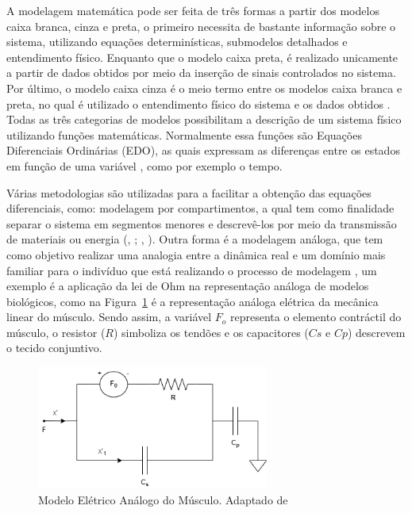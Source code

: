 A modelagem matemática pode ser feita de três formas a partir dos modelos caixa branca, cinza e preta, o primeiro necessita de bastante informação sobre o sistema, utilizando equações determinísticas, submodelos detalhados e entendimento físico. Enquanto que o modelo caixa preta, é realizado unicamente a partir de dados obtidos por meio da inserção de sinais controlados no sistema. Por último, o modelo caixa cinza é o meio termo entre os modelos caixa branca e preta, no qual é utilizado o entendimento físico do sistema e os dados obtidos \cite{barbosa2010}. Todas as três categorias de modelos possibilitam a descrição de um sistema físico utilizando funções matemáticas. Normalmente essa funções são Equações Diferenciais Ordinárias (EDO), as quais expressam as diferenças entre os estados em função de uma variável \cite{witelski2015}, como por exemplo o tempo. 

Várias metodologias são utilizadas para a facilitar a obtenção das equações diferenciais, como: modelagem por compartimentos, a qual tem como finalidade separar o sistema em segmentos menores e descrevê-los por meio da transmissão de materiais ou energia (\citeauthor{anderson2013compartmental}, \citeyear{anderson2013compartmental}; \citeauthor{King2011}, \citeyear{King2011}). Outra forma é a modelagem análoga, que tem como objetivo realizar uma analogia entre a dinâmica real e um domínio mais familiar para o indivíduo que está realizando o processo de modelagem \cite{Khoo2000}, um exemplo é a aplicação da lei de Ohm na representação análoga de modelos biológicos, como na Figura~\ref{exemplo_analogo1} é a  representação análoga elétrica da mecânica linear do músculo. Sendo assim, a variável $F_o$ representa o elemento contráctil do músculo, o resistor ($R$) simboliza os tendões e os capacitores ($Cs$ e $Cp$) descrevem o tecido conjuntivo.

\begin{figure}[htb]
 \begin{center}
  \includegraphics[width=3.0in]{figuras/linear_musculo.png}
   \caption{{Modelo Elétrico Análogo do Músculo. Adaptado de \cite{Khoo2000}}}
   \label{exemplo_analogo1} 
  \end{center}
\end{figure}


